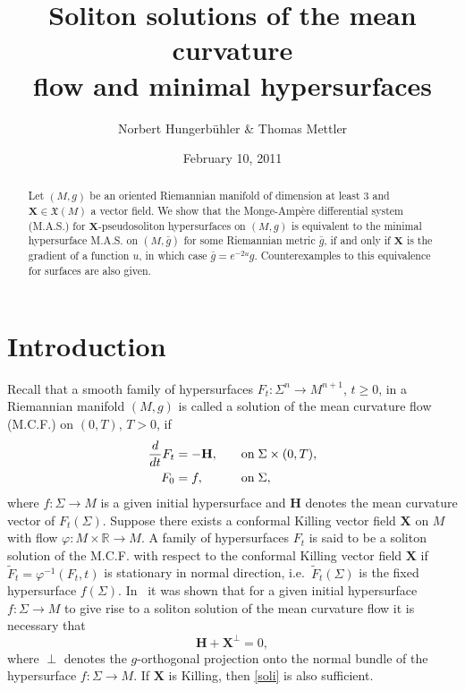 \documentclass[11pt,letterpaper]{amsart}
\title[Solitons and minimal hypersurfaces]{Soliton solutions of the mean curvature\\ flow and minimal hypersurfaces}
\author[N. Hungerb\"uhler \& T. Mettler]{Norbert Hungerb\"uhler \& Thomas Mettler}
\date{February 10, 2011}
\theoremstyle{definition}
\numberwithin{equation}{section}
\begin{document}
\maketitle

\begin{abstract}
Let $(M,g)$ be an oriented Riemannian manifold of dimension at least $3$ and ${\mathbf{X}} \in \mathfrak{X}(M)$ a vector field. We show that the {Monge-Amp\`ere } differential system (M.A.S.) for ${\mathbf{X}}$-pseudosoliton hypersurfaces on $(M,g)$ is equivalent to the minimal hypersurface M.A.S. on $(M,\bar{g})$ for some Riemannian metric $\bar{g}$, if and only if ${\mathbf{X}}$ is the gradient of a function $u$, in which case $\bar{g}=e^{-2u}g$. Counterexamples to this equivalence for surfaces are also given. 
\end{abstract}

\section{Introduction}

Recall that a smooth family of hypersurfaces $F_t : \Sigma^n \to M^{n+1}$, $t \geq 0$, in a Riemannian manifold $(M,g)$ is called a solution of the mean curvature flow (M.C.F.) on $(0,T)$, $T>0$, if
$$
\aligned
\frac{d}{dt} F_t&=-{\mathbf{H}}, \quad &\textrm{on}&\; \Sigma \times (0,T),\\
F_0&=f, \quad &\textrm{on}&\; \Sigma,\\
\endaligned
$$
where $f : \Sigma \to M$ is a given initial hypersurface and ${\mathbf{H}}$ denotes the mean curvature vector of $F_t(\Sigma)$. Suppose there exists a conformal Killing vector field ${\mathbf{X}}$ on $M$ with flow $\varphi : M \times {\mathbb{R}} \to M$. A family of hypersurfaces $F_t$ is said to be a soliton solution of the M.C.F. with respect to the conformal Killing vector field ${\mathbf{X}}$ if $\tilde{F}_t=\varphi^{-1}(F_t,t)$ is stationary in normal direction, i.e.~$\tilde{F}_t(\Sigma)$ is the fixed hypersurface $f(\Sigma)$. In~\cite{MR1787070} it was shown that for a given initial hypersurface $f: \Sigma \to M$ to give rise to a soliton solution of the mean curvature flow it is necessary that
\begin{equation}\label{soli}
{\mathbf{H}}+{\mathbf{X}}^{\perp}=0,
\end{equation}
where $\perp$ denotes the $g$-orthogonal projection onto the normal bundle of the hypersurface $f : \Sigma \to M$. If ${\mathbf{X}}$ is Killing, then \eqref{soli} is also sufficient. 
\end{document}
